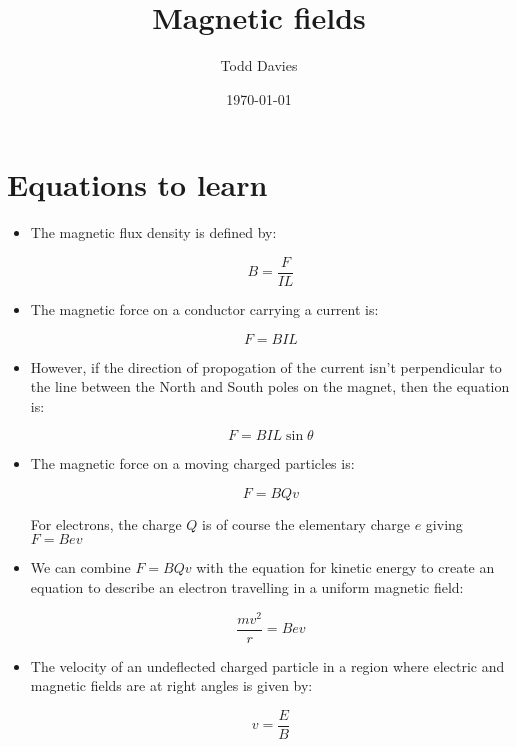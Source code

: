 \documentclass{article}
\title{Magnetic fields}
\author{Todd Davies}
\date{\today}
\begin{document}
\lhead{\today}

\maketitle

\section*{Equations to learn}
\thispagestyle{empty}

\begin{itemize}
	
	\item The magnetic flux density is defined by:
	
	\[
		B = \frac{F}{IL}
	\]

	\item The magnetic force on a conductor carrying a current is:
	
	\[
		F=BIL
	\]

	\item However, if the direction of propogation of the current isn't
	perpendicular to the line between the North and South poles on the magnet,
	then the equation is:

	\[
		F=BIL\sin{\theta}
	\]

	\item The magnetic force on a moving charged particles is:

	\[
		F=BQv
	\]

	For electrons, the charge $Q$ is of course the elementary charge $e$ giving
	$F=Bev$

    \item We can combine $F=BQv$ with the equation for kinetic energy to create
	an equation to describe an electron travelling in a uniform magnetic field:

	\[
		\frac{mv^2}{r} = Bev
	\]

	\item The velocity of an undeflected charged particle in a region where
	electric and magnetic fields are at right angles is given by:

	\[
		v = \frac{E}{B}
	\]

\end{itemize}

\end{document}
